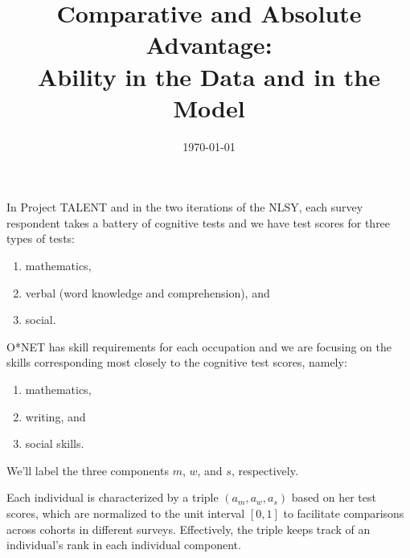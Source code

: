 \documentclass[onehalfspacing,11pt]{article}
\begin{document}

\title{Comparative and Absolute Advantage:\\%
Ability in the Data and in the Model}


\date{\today \\ \vspace{5mm} }%

\maketitle

%
In Project TALENT and in the two iterations of the NLSY, each survey respondent takes a battery of cognitive tests and we have test scores for three types of tests:
\begin{enumerate}
  \item mathematics,
  \item verbal (word knowledge and comprehension), and
  \item social.
\end{enumerate}
O*NET has skill requirements for each occupation and we are focusing on the skills corresponding most closely to the cognitive test scores, namely:
\begin{enumerate}
  \item mathematics,
  \item writing, and
  \item social skills.
\end{enumerate}
We'll label the three components $m$, $w$, and $s$, respectively.

Each individual is characterized by a triple $(a_m,a_w,a_s)$ based on her test scores, which are normalized to the unit interval $[0,1]$ to facilitate comparisons across cohorts in different surveys. Effectively, the triple keeps track of an individual's rank in each individual component.
\end{document}
